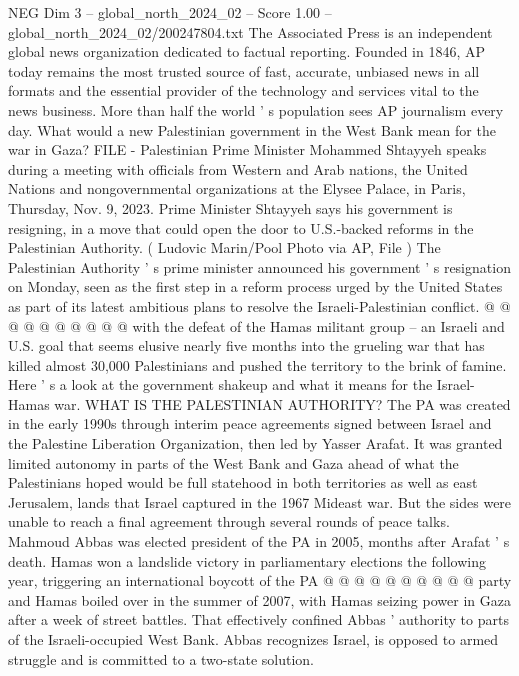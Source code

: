 \begin{textsample}{NEG Dim 3 – global\_north\_2024\_02 – Score 1.00 – global\_north\_2024\_02/200247804.txt}  \label{ex:f3_neg_207}
The Associated Press is an independent global news organization dedicated to factual reporting.
Founded in 1846, AP today remains the most trusted source of fast, accurate, unbiased news in all formats and the essential provider of the technology and services vital to the news business.
More than half the world ' s population sees AP journalism every day.
What would a new Palestinian government in the West Bank mean for the war in Gaza?
FILE - Palestinian Prime Minister Mohammed Shtayyeh speaks during a meeting with officials from Western and Arab nations, the United Nations and nongovernmental organizations at the Elysee Palace, in Paris, Thursday, Nov. 9, 2023.
Prime Minister Shtayyeh says his government is resigning, in a move that could open the door to U.S.-backed reforms in the Palestinian Authority. ( Ludovic Marin/Pool Photo via AP, File ) The Palestinian Authority ' s prime minister announced his government ' s resignation on Monday, seen as the first step in a reform process urged by the United States as part of its latest ambitious plans to resolve the Israeli-Palestinian conflict. @ @ @ @ @ @ @ @ @ @ with the defeat of the Hamas militant group -- an Israeli and U.S. goal that seems elusive nearly five months into the grueling war that has killed almost 30,000 Palestinians and pushed the territory to the brink of famine.
Here ' s a look at the government shakeup and what it means for the Israel-Hamas war.
WHAT IS THE PALESTINIAN AUTHORITY?
The PA was created in the early 1990s through interim peace agreements signed between Israel and the Palestine Liberation Organization, then led by Yasser Arafat.
It was granted limited autonomy in parts of the West Bank and Gaza ahead of what the Palestinians hoped would be full statehood in both territories as well as east Jerusalem, lands that Israel captured in the 1967 Mideast war.
But the sides were unable to reach a final agreement through several rounds of peace talks.
Mahmoud Abbas was elected president of the PA in 2005, months after Arafat ' s death.
Hamas won a landslide victory in parliamentary elections the following year, triggering an international boycott of the PA @ @ @ @ @ @ @ @ @ @ party and Hamas boiled over in the summer of 2007, with Hamas seizing power in Gaza after a week of street battles.
That effectively confined Abbas ' authority to parts of the Israeli-occupied West Bank.
Abbas recognizes Israel, is opposed to armed struggle and is committed to a two-state solution.

\end{textsample}
